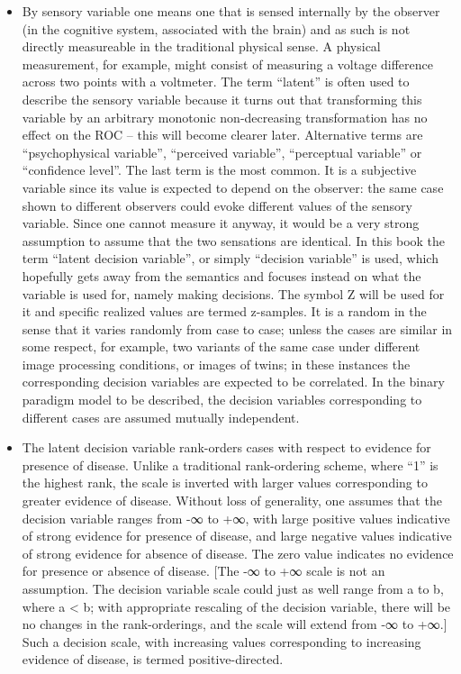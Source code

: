 \documentclass[
]{book}
\providecommand{\tightlist}{%
  \setlength{\itemsep}{0pt}\setlength{\parskip}{0pt}}
\begin{document}
\begin{itemize}
\tightlist
\item
  By sensory variable one means one that is sensed internally by the observer (in the cognitive system, associated with the brain) and as such is not directly measureable in the traditional physical sense. A physical measurement, for example, might consist of measuring a voltage difference across two points with a voltmeter. The term ``latent'' is often used to describe the sensory variable because it turns out that transforming this variable by an arbitrary monotonic non-decreasing transformation has no effect on the ROC -- this will become clearer later. Alternative terms are ``psychophysical variable'', ``perceived variable'', ``perceptual variable'' or ``confidence level''. The last term is the most common. It is a subjective variable since its value is expected to depend on the observer: the same case shown to different observers could evoke different values of the sensory variable. Since one cannot measure it anyway, it would be a very strong assumption to assume that the two sensations are identical. In this book the term ``latent decision variable'', or simply ``decision variable'' is used, which hopefully gets away from the semantics and focuses instead on what the variable is used for, namely making decisions. The symbol Z will be used for it and specific realized values are termed z-samples. It is a random in the sense that it varies randomly from case to case; unless the cases are similar in some respect, for example, two variants of the same case under different image processing conditions, or images of twins; in these instances the corresponding decision variables are expected to be correlated. In the binary paradigm model to be described, the decision variables corresponding to different cases are assumed mutually independent.
\item
  The latent decision variable rank-orders cases with respect to evidence for presence of disease. Unlike a traditional rank-ordering scheme, where ``1'' is the highest rank, the scale is inverted with larger values corresponding to greater evidence of disease. Without loss of generality, one assumes that the decision variable ranges from -∞ to +∞, with large positive values indicative of strong evidence for presence of disease, and large negative values indicative of strong evidence for absence of disease. The zero value indicates no evidence for presence or absence of disease. {[}The -∞ to +∞ scale is not an assumption. The decision variable scale could just as well range from a to b, where a \textless{} b; with appropriate rescaling of the decision variable, there will be no changes in the rank-orderings, and the scale will extend from -∞ to +∞.{]} Such a decision scale, with increasing values corresponding to increasing evidence of disease, is termed positive-directed.
\end{itemize}
\end{document}
